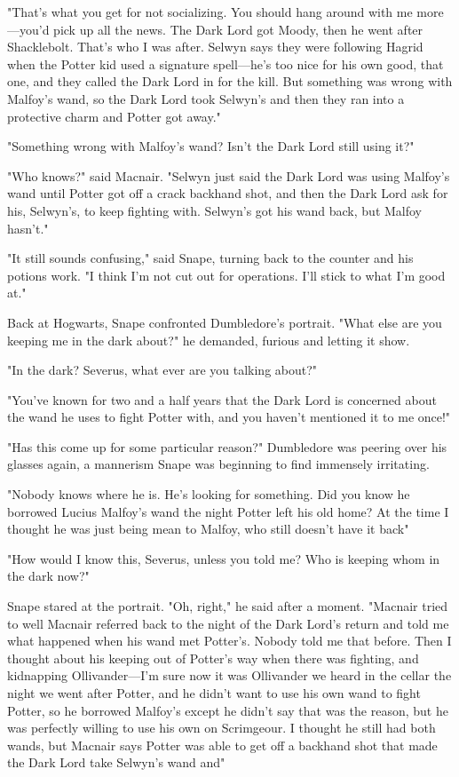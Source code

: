 "That's what you get for not socializing. You should hang around with me more—you'd pick up all the news. The Dark Lord got Moody, then he went after Shacklebolt. That's who I was after. Selwyn says they were following Hagrid when the Potter kid used a signature spell—he's too nice for his own good, that one, and they called the Dark Lord in for the kill. But something was wrong with Malfoy's wand, so the Dark Lord took Selwyn's and then they ran into a protective charm and Potter got away."

"Something wrong with Malfoy's wand? Isn't the Dark Lord still using it?"

"Who knows?" said Macnair. "Selwyn just said the Dark Lord was using Malfoy's wand until Potter got off a crack backhand shot, and then the Dark Lord ask for his, Selwyn's, to keep fighting with. Selwyn's got his wand back, but Malfoy hasn't."

"It still sounds confusing," said Snape, turning back to the counter and his potions work. "I think I'm not cut out for operations. I'll stick to what I'm good at."

Back at Hogwarts, Snape confronted Dumbledore's portrait. "What else are you keeping me in the dark about?" he demanded, furious and letting it show.

"In the dark? Severus, what ever are you talking about?"

"You've known for two and a half years that the Dark Lord is concerned about the wand he uses to fight Potter with, and you haven't mentioned it to me once!"

"Has this come up for some particular reason?" Dumbledore was peering over his glasses again, a mannerism Snape was beginning to find immensely irritating.

"Nobody knows where he is. He's looking for something. Did you know he borrowed Lucius Malfoy's wand the night Potter left his old home? At the time I thought he was just being mean to Malfoy, who still doesn't have it back{\el}"

"How would I know this, Severus, unless you told me? Who is keeping whom in the dark now?"

Snape stared at the portrait. "Oh, right," he said after a moment. "Macnair tried to{\el} well Macnair referred back to the night of the Dark Lord's return and told me what happened when his wand met Potter's. Nobody told me that before. Then I thought about his keeping out of Potter's way when there was fighting, and kidnapping Ollivander—I'm sure now it was Ollivander we heard in the cellar the night we went after Potter, and he didn't want to use his own wand to fight Potter, so he borrowed Malfoy's except he didn't say that was the reason, but he was perfectly willing to use his own on Scrimgeour. I thought he still had both wands, but Macnair says Potter was able to get off a backhand shot that made the Dark Lord take Selwyn's wand and{\el}"

